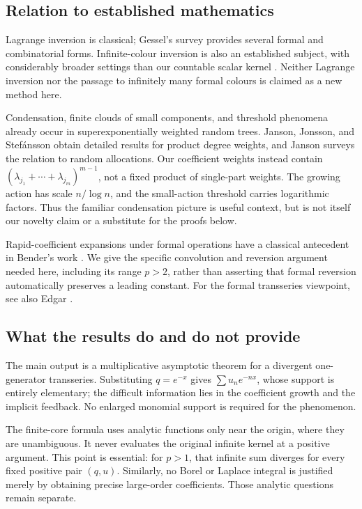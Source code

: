 \documentclass[11pt,a4paper]{article}
\numberwithin{equation}{section}
\theoremstyle{definition}
\theoremstyle{remark}
\begin{document}
\subsection{Relation to established mathematics}

Lagrange inversion is classical; Gessel's survey \cite{gessel} provides several
formal and combinatorial forms. Infinite-colour inversion is also an
established subject, with considerably broader settings than our countable
scalar kernel \cite{jkt}. Neither Lagrange inversion nor the passage to
infinitely many formal colours is claimed as a new method here.

Condensation, finite clouds of small components, and threshold phenomena
already occur in superexponentially weighted random trees. Janson, Jonsson,
and Stef\'ansson \cite{jjs} obtain detailed results for product degree weights,
and Janson \cite{janson} surveys the relation to random allocations. Our
coefficient weights instead contain
$(\lambda_{j_1}+\cdots+\lambda_{j_m})^{m-1}$, not a fixed product of
single-part weights. The growing action has scale $n/\log n$, and the
small-action threshold carries logarithmic factors. Thus the familiar
condensation picture is useful context, but is not itself our novelty claim
or a substitute for the proofs below.

Rapid-coefficient expansions under formal operations have a classical
antecedent in Bender's work \cite{bender}. We give the specific convolution
and reversion argument needed here, including its range $p>2$, rather than
asserting that formal reversion automatically preserves a leading constant.
For the formal transseries viewpoint, see also Edgar \cite{edgar}.

\subsection{What the results do and do not provide}

The main output is a multiplicative asymptotic theorem for a divergent
one-generator transseries. Substituting $q=e^{-x}$ gives
$\sum u_ne^{-nx}$, whose support is entirely elementary; the difficult
information lies in the coefficient growth and the implicit feedback.
No enlarged monomial support is required for the phenomenon.

The finite-core formula uses analytic functions only near the origin, where
they are unambiguous. It never evaluates the original infinite kernel at a
positive argument. This point is essential: for $p>1$, that infinite sum
diverges for every fixed positive pair $(q,u)$. Similarly, no Borel or
Laplace integral is justified merely by obtaining precise large-order
coefficients. Those analytic questions remain separate.
\end{document}
